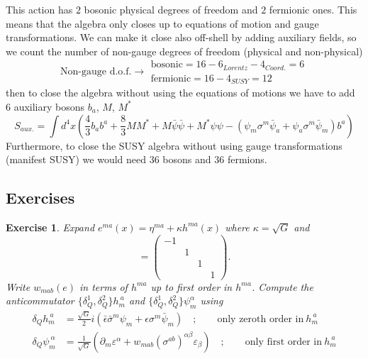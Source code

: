 \documentclass[a4paper,12pt]{article}
\newtheorem{exe}{Exercise}
\numberwithin{equation}{section}
\numberwithin{exe}{section}
\newcommand{\p}{{\partial}}
\renewcommand{\a}{{\alpha}}
\renewcommand{\b}{{\beta}}
\renewcommand{\d}{{\delta}}
\newcommand{\e}{{\epsilon}}
\newcommand{\eb}{{\bar\epsilon}}
\newcommand{\ve}{{\varepsilon}}
\renewcommand{\k}{{\kappa}}
\newcommand{\s}{{\sigma}}
\renewcommand{\sb}{{\bar\sigma}}
\newcommand{\psib}{{\bar\psi}}
\begin{document}
This action has $2$ bosonic physical degrees of freedom and $2$ fermionic ones. This means that the algebra only closes up to equations of motion and gauge transformations. We can make it close also off-shell by adding auxiliary fields, so we count the number of non-gauge degrees of freedom (physical and non-physical)
	\begin{equation}
	\text{Non-gauge d.o.f.} \rightarrow
		\begin{array}{l}
		\text{bosonic} = 16 - 6_{Lorentz} -4_{Coord.} = 6 \\
		\text{fermionic} = 16 - 4_{SUSY} = 12
		\end{array}
	\end{equation}
then to close the algebra without using the equations of motions we have to add 6 auxiliary bosons $b_a$, $M$, $M^*$
	\begin{equation}
	S_{aux.} = \int d^4x \left(\frac43 b_a b^a + \frac83 M M^* + M\psib\psib + M^* \psi\psi - (\psi_m\s^m \psib_a + \psi_a\s^m\psib_m)b^a\right)
	\end{equation}
Furthermore, to close the SUSY algebra without using gauge transformations (manifest SUSY) we would need $36$ bosons and $36$ fermions.

\subsection{Exercises}

	\begin{exe}
	Expand $e^{ma}(x) = \eta^{ma} + \k h^{ma}(x)$ where $\k = \sqrt G$ and
		\begin{equation*}
		[\eta^{ma}] = \left(
			\begin{array}{cccc}
			-1 & & & \\
			& 1 & & \\
			& & 1 & \\
			& & & 1
			\end{array}
		\right).
		\end{equation*}
	Write $w_{mab}(e)$ in terms of $h^{ma}$ up to first order in $h^{ma}$. Compute the anticommutator $\{\d^1_Q, \d^2_Q\}h^{\ a}_m$ and $\{\d^1_Q, \d^2_Q\}\psi^\a_m$ using
		\begin{align}
		\d_Q h_m^{\ a} & = \frac{\sqrt G}{2} i (\eb \sb^m \psi_m + \e \s^m \psib_m)\quad;\qquad\text{only zeroth order in}\ h_m^{\ a} \\
		\d_Q \psi_m^{\ \a} & = \frac{1}{\sqrt G} (\p_m \ve^\a + w_{mab} (\s^{ab})^{\a\b} \ve_\b)\quad;\qquad\text{only first order in}\ h_m^{\ a}
		\end{align}
	\end{exe}
\end{document}
